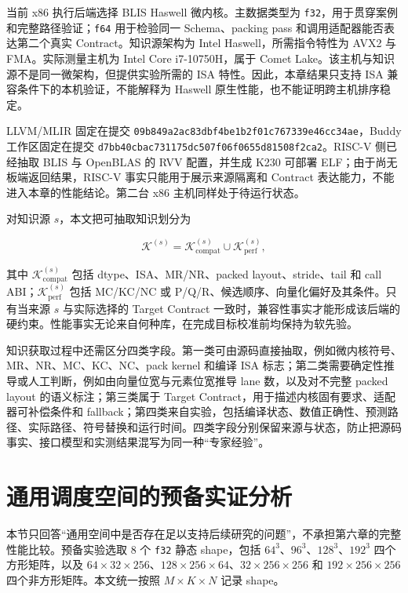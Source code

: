 当前 x86 执行后端选择 BLIS Haswell 微内核。主数据类型为 \texttt{f32}，用于贯穿案例和完整路径验证；\texttt{f64} 用于检验同一 Schema、packing pass 和调用适配器能否表达第二个真实 Contract。知识源架构为 Intel Haswell，所需指令特性为 AVX2 与 FMA。实际测量主机为 Intel Core i7-10750H，属于 Comet Lake。该主机与知识源不是同一微架构，但提供实验所需的 ISA 特性。因此，本章结果只支持 ISA 兼容条件下的本机验证，不能解释为 Haswell 原生性能，也不能证明跨主机排序稳定。

LLVM/MLIR 固定在提交 \texttt{09b849a2ac83dbf4be1b2f01c767339e46cc34ae}，Buddy 工作区固定在提交 \texttt{d7bb40cbac731175dc507f06f0655d81508f2ca2}。RISC-V 侧已经抽取 BLIS 与 OpenBLAS 的 RVV 配置，并生成 K230 可部署 ELF；由于尚无板端返回结果，RISC-V 事实只能用于展示来源隔离和 Contract 表达能力，不能进入本章的性能结论。第二台 x86 主机同样处于待运行状态。

对知识源 $s$，本文把可抽取知识划分为

\begin{equation}
\mathcal{K}^{(s)}
=
\mathcal{K}_{\mathrm{compat}}^{(s)}
\cup
\mathcal{K}_{\mathrm{perf}}^{(s)},
\label{eq:chapter3-knowledge-classes}
\end{equation}

其中 $\mathcal{K}_{\mathrm{compat}}^{(s)}$ 包括 dtype、ISA、MR/NR、packed layout、stride、tail 和 call ABI；$\mathcal{K}_{\mathrm{perf}}^{(s)}$ 包括 MC/KC/NC 或 P/Q/R、候选顺序、向量化偏好及其条件。只有当来源 $s$ 与实际选择的 Target Contract 一致时，兼容性事实才能形成该后端的硬约束。性能事实无论来自何种库，在完成目标校准前均保持为软先验。

知识获取过程中还需区分四类字段。第一类可由源码直接抽取，例如微内核符号、MR、NR、MC、KC、NC、pack kernel 和编译 ISA 标志；第二类需要确定性推导或人工判断，例如由向量位宽与元素位宽推导 lane 数，以及对不完整 packed layout 的语义标注；第三类属于 Target Contract，用于描述内核固有要求、适配器可补偿条件和 fallback；第四类来自实验，包括编译状态、数值正确性、预测路径、实际路径、符号替换和运行时间。四类字段分别保留来源与状态，防止把源码事实、接口模型和实测结果混写为同一种“专家经验”。

\section{通用调度空间的预备实证分析}

本节只回答“通用空间中是否存在足以支持后续研究的问题”，不承担第六章的完整性能比较。预备实验选取 8 个 \texttt{f32} 静态 shape，包括 $64^3$、$96^3$、$128^3$、$192^3$ 四个方形矩阵，以及 $64\times32\times256$、$128\times256\times64$、$32\times256\times256$ 和 $192\times256\times256$ 四个非方形矩阵。本文统一按照 $M\times K\times N$ 记录 shape。

